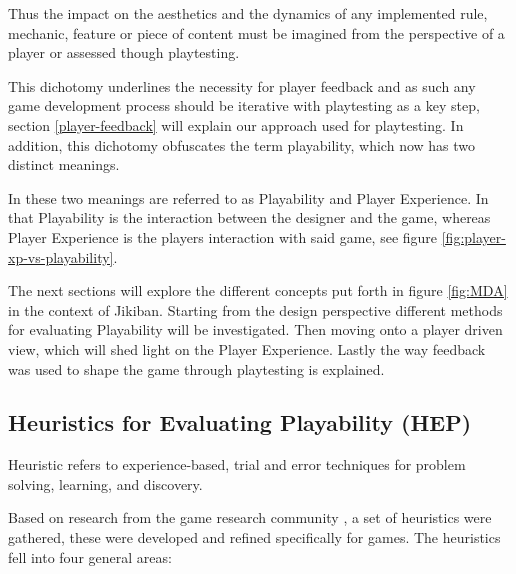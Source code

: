 Thus the impact on the aesthetics and the dynamics of any implemented
rule, mechanic, feature or piece of content must be imagined from the
perspective of a player or assessed though playtesting.

This dichotomy underlines the necessity for player feedback and as
such any game development process should be iterative with playtesting
as a key step, section \ref{player-feedback} will explain our
approach used for playtesting. In addition, this dichotomy obfuscates
the term playability, which now has two distinct meanings.

In \cite{nacke09} these two meanings are referred to as Playability
and Player Experience. In that Playability is the interaction between
the designer and the game, whereas Player Experience is the players
interaction with said game, see figure
\ref{fig:player-xp-vs-playability}.\\



The next sections will explore the different concepts put forth in
figure \ref{fig:MDA} in the context of Jikiban. Starting from the design
perspective different methods for evaluating Playability will be
investigated. Then moving onto a player driven view, which will shed
light on the Player Experience. Lastly the way feedback was used to
shape the game through playtesting is explained.

\subsection{Heuristics for Evaluating Playability (HEP)}
Heuristic refers to experience-based, trial and error techniques for
problem solving, learning, and discovery.

Based on research from the game research community \cite{desurvire08,
  hunicke01-04, sanchez09}, a set of heuristics were gathered, these
were developed and refined specifically for games. The heuristics fell
into four general areas:

